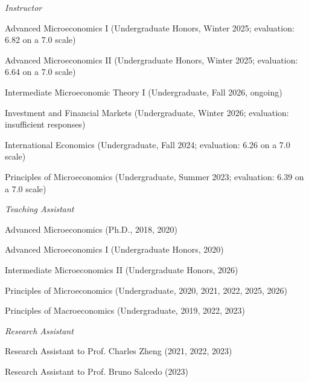 \documentclass[10pt,letterpaper]{article}
\newcommand{\cvsubsection}[1]{%
    \par\addvspace{11pt}
    {\fontsize{12}{15}\selectfont\itshape #1\par}
    \vspace{7pt}
}
\newenvironment{cventries}
{\begin{list}{}{%
    \setlength{\leftmargin}{1.5em}
    \setlength{\rightmargin}{0pt}
    \setlength{\itemsep}{8pt}
    \setlength{\parsep}{0pt}
    \setlength{\topsep}{0pt}
}}
{\end{list}}
\begin{document}
\cvsubsection{Instructor}

\begin{cventries}

\item Advanced Microeconomics I (Undergraduate Honors, Winter 2025; evaluation: 6.82 on a 7.0 scale)

\item Advanced Microeconomics II (Undergraduate Honors, Winter 2025; evaluation: 6.64 on a 7.0 scale)

\item Intermediate Microeconomic Theory I (Undergraduate, Fall 2026, ongoing)

\item Investment and Financial Markets (Undergraduate, Winter 2026; evaluation: insufficient responses)

\item International Economics (Undergraduate, Fall 2024; evaluation: 6.26 on a 7.0 scale)

\item Principles of Microeconomics (Undergraduate, Summer 2023; evaluation: 6.39 on a 7.0 scale)

\end{cventries}

\cvsubsection{Teaching Assistant}

\begin{cventries}

\item Advanced Microeconomics (Ph.D., 2018, 2020)

\item Advanced Microeconomics I (Undergraduate Honors, 2020)

\item Intermediate Microeconomics II (Undergraduate Honors, 2026)

\item Principles of Microeconomics (Undergraduate, 2020, 2021, 2022, 2025, 2026)

\item Principles of Macroeconomics (Undergraduate, 2019, 2022, 2023)

\end{cventries}

\cvsubsection{Research Assistant}

\begin{cventries}

\item Research Assistant to Prof. Charles Zheng (2021, 2022, 2023)

\item Research Assistant to Prof. Bruno Salcedo (2023)

\end{cventries}
\end{document}
